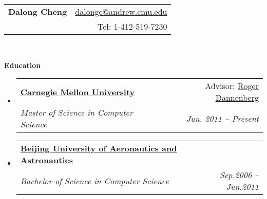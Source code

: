 \documentclass[letterpaper,11pt]{article}
\makeatletter
\newcommand{\resitem}[1]{\item #1 \vspace{-2pt}}
\newcommand{\resheading}[1]{{\large \colorbox{mygrey}{\begin{minipage}{\textwidth}{\textbf{#1 \vphantom{p\^{E}}}}\end{minipage}}}}
\newcommand{\ressubheading}[4]{
\begin{tabular*}{6.5in}{l@{\extracolsep{\fill}}r}
		\textbf{#1} & #2 \\
		\textit{#3} & \textit{#4} \\
\end{tabular*}\vspace{-6pt}}
\makeatother
\begin{document}
\newcommand{\mywebheader}{
\begin{tabular*}{7in}{l@{\extracolsep{\fill}}r}
	\textbf{\LARGE Dalong Cheng} & \href{mailto:dalongc@andrew.cmu.edu}{dalongc@andrew.cmu.edu}\\
	{\footnotesize \texttt{}} & {Tel: 1-412-519-7230} \\
	\end{tabular*}
\\
\vspace{0.1in}}

\mywebheader

\resheading{Education}
	\begin{itemize}
		\item
            \ressubheading{\href{http://www.cmu.edu}{Carnegie Mellon University}}{Advisor: \href{http://www.cs.cmu.edu/~rbd}{Roger Dannenberg}}{{Master of Science in Computer Science}}{Jun. 2011 -- Present}
        \item	
            \ressubheading{\href{http://ev.buaa.edu.cn}{Beijing University of Aeronautics and Astronautics}}{}{{Bachelor of Science in Computer Science}}{Sep.2006 -- Jun.2011}
				
\begin{comment}
		\item
			\ressubheading{\href{http://bcc.billings.k12.mt.us/}{Billings Career Center}}{Billings, MT}{\href{http://www.cisco.com/web/learning/netacad/index.html}{Cisco Networking Academy}; GPA:3.33}{Aug. 2002 - May 2003}
				{ \footnotesize
				\begin{itemize}
				\resitem{Graduated \href{http://www.cisco.com/web/learning/netacad/index.html}{Cisco Semester Four} comprising of coursework in networking infrastructures including LAN and WAN design and implementation}
				\end{itemize}
				}
\begin{comment}
		\item
			\ressubheading{\href{http://bcc.billings.k12.mt.us/}{Billings Career Center}}{Billings, MT}{\href{http://www.cisco.com/web/learning/netacad/index.html}{Cisco Networking Academy}; GPA:3.33}{Aug. 2002 - May 2003}
				{ \footnotesize
				\begin{itemize}
				\resitem{Graduated \href{http://www.cisco.com/web/learning/netacad/index.html}{Cisco Semester Four} comprising of coursework in networking infrastructures including LAN and WAN design and implementation}
				\end{itemize}
				}
\end{comment}
	\end{itemize} %
\end{document}
